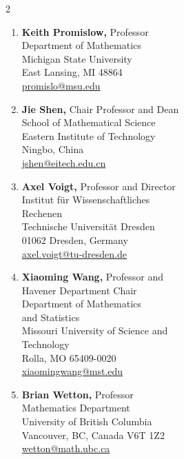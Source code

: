 \documentclass[11pt]{letter}
\begin{document}
\begin{multicols}{2}
\begin{enumerate}
	\columnbreak
	
	\item
\textbf{Keith Promislow,} Professor
	\\
Department of Mathematics
	\\
Michigan State University
	\\
East Lansing, MI 48864
	\\
\url{promislo@msu.edu}
	
	\item
\textbf{Jie Shen,} Chair Professor and Dean
	\\
School of Mathematical Science
	\\
Eastern Institute of Technology
	\\
Ningbo, China
	\\
\url{jshen@eitech.edu.cn}

 	\item
\textbf{Axel Voigt,} Professor and Director
	\\
Institut f\"{u}r Wissenschaftliches 
	\\
\hspace*{0.25in} Rechenen
	\\
Technische Universit\"{a}t Dresden
	\\
01062 Dresden, Germany
	\\
\url{axel.voigt@tu-dresden.de}
	
	\item
\textbf{Xiaoming Wang,} Professor and  
	\\
\hspace*{0.25in} Havener Department Chair
	\\
Department of Mathematics 
	\\
\hspace*{0.25in}and Statistics
	\\
Missouri University of Science and
	\\
\hspace*{0.25in} Technology
	\\
Rolla, MO 65409-0020
	\\
\url{xiaomingwang@mst.edu}
	\item
\textbf{Brian Wetton,} Professor
	\\
Mathematics Department
	\\
University of British Columbia 
	\\
Vancouver, BC, Canada V6T 1Z2
	\\
\url{wetton@math.ubc.ca}

	\end{enumerate}
	
	\end{multicols}
	
    
\end{document}
